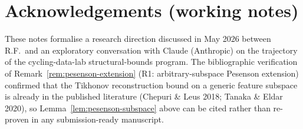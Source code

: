 \documentclass[11pt,a4paper]{article}
\theoremstyle{plain}
\theoremstyle{definition}
\theoremstyle{remark}
\begin{document}
\section*{Acknowledgements (working notes)}

These notes formalise a research direction discussed in May 2026
between R.F.\ and an exploratory conversation with Claude
(Anthropic) on the trajectory of the cycling-data-lab structural-bounds
program.  The bibliographic verification of Remark~\ref{rem:pesenson-extension}
(R1: arbitrary-subspace Pesenson extension) confirmed that the
Tikhonov reconstruction bound on a generic feature subspace is already
in the published literature (Chepuri \& Leus 2018; Tanaka \& Eldar 2020),
so Lemma~\ref{lem:pesenson-subspace} above can be cited rather than
re-proven in any submission-ready manuscript.
\end{document}
